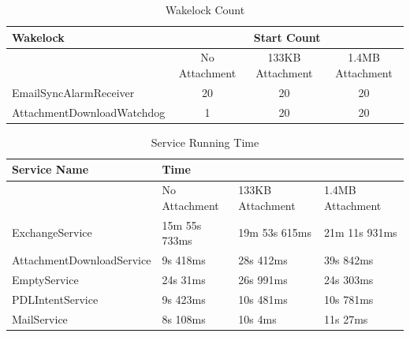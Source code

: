 \begin{table}[!h]
\centering
\caption{Wakelock Count}
\label{my-label}
\begin{tabular}{|l|c|c|c|}
\hline
Wakelock                            & \multicolumn{3}{c|}{Start Count}                    \\ \hline
                                    & No Attachment & 133KB Attachment & 1.4MB Attachment \\ \hline
EmailSyncAlarmReceiver              & 20            & 20               & 20               \\ \hline
AttachmentDownloadWatchdog & 1             & 20               & 20               \\ \hline
\end{tabular}
\end{table}
\begin{table}[!h]
\centering
\caption{Service Running Time}
\label{my-label}
\begin{tabular}{|l|l|l|l|}
\hline
Service Name              & \multicolumn{3}{P{10cm}|}{Time}                           \\ \hline
                          & No Attachment & 133KB Attachment & 1.4MB Attachment \\ \hline
ExchangeService           & 15m 55s 733ms & 19m 53s 615ms    & 21m 11s 931ms     \\ \hline
AttachmentDownloadService & 9s 418ms      & 28s 412ms        & 39s 842ms        \\ \hline
EmptyService              & 24s 31ms      & 26s 991ms          & 24s 303ms         \\ \hline
PDLIntentService          & 9s 423ms      & 10s 481ms         & 10s 781ms         \\ \hline
MailService               & 8s 108ms      & 10s 4ms         & 11s 27ms         \\ \hline
\end{tabular}
\end{table}

